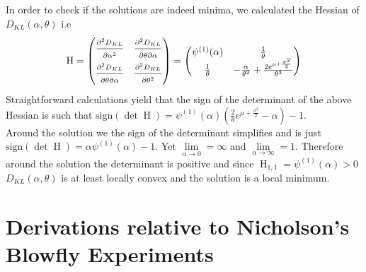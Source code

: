 \documentclass[12pt]{article}
\begin{document}
\begin{appendices}
	In order to check if the solutions are indeed minima, we calculated the Hessian of $D_{KL}(\alpha, \theta)$ i.e
	\begin{equation*}
	\text{H} = \begin{pmatrix}
	\frac{\strut \partial^2 D_{KL}}{\strut \partial \alpha^2} & \frac{\strut \partial^2 D_{KL}}{\strut \partial \theta \partial \alpha} \\
	\frac{\strut \partial^2 D_{KL}}{\strut \partial \theta \partial \alpha} & \frac{\strut \partial^2 D_{KL}}{\strut \partial \theta^2} 
	\end{pmatrix} =
	\begin{pmatrix}
	\psi^{(1)}(\alpha) & \frac{1}{\theta} \\
	\frac{1}{\theta} & -\frac{\alpha}{\theta^2}+\frac{2e^{\mu +\frac{\sigma^2}{2}}}{\theta^3}
	\end{pmatrix}
	\end{equation*}
	Straightforward calculations yield that the sign of the determinant of the above Hessian is such that $\text{sign}(\det{\operatorname{H}}) = \psi^{(1)}(\alpha)(\frac{2}{\theta}e^{\mu +\frac{\sigma^2}{2}} - \alpha) - 1$. \\
	Around the solution we the sign of the determinant simplifies and is just $\text{sign}(\det{\operatorname{H}}) = \alpha\psi^{(1)}(\alpha) - 1$. Yet $\lim\limits_{\alpha \rightarrow 0} = \infty$ and $\lim\limits_{\alpha \rightarrow \infty} = 1$. Therefore around the solution the determinant is positive and since $\operatorname{H}_{1,1} = \psi^{(1)}(\alpha) > 0$ $D_{KL}(\alpha, \theta)$ is at least locally convex and the solution is a local minimum.
	
	\section{Derivations relative to Nicholson's Blowfly Experiments} \label{AppendBlowfly}

\end{appendices}
\end{document}
